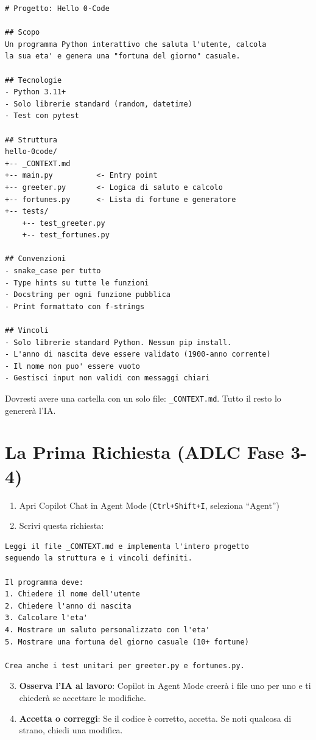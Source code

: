\begin{lstlisting}[language={},title={\texttt{\_CONTEXT.md} per Hello 0-Code}]
# Progetto: Hello 0-Code

## Scopo
Un programma Python interattivo che saluta l'utente, calcola
la sua eta' e genera una "fortuna del giorno" casuale.

## Tecnologie
- Python 3.11+
- Solo librerie standard (random, datetime)
- Test con pytest

## Struttura
hello-0code/
+-- _CONTEXT.md
+-- main.py          <- Entry point
+-- greeter.py       <- Logica di saluto e calcolo
+-- fortunes.py      <- Lista di fortune e generatore
+-- tests/
    +-- test_greeter.py
    +-- test_fortunes.py

## Convenzioni
- snake_case per tutto
- Type hints su tutte le funzioni
- Docstring per ogni funzione pubblica
- Print formattato con f-strings

## Vincoli
- Solo librerie standard Python. Nessun pip install.
- L'anno di nascita deve essere validato (1900-anno corrente)
- Il nome non puo' essere vuoto
- Gestisci input non validi con messaggi chiari
\end{lstlisting}

\begin{checkpointbox}
Dovresti avere una cartella con un solo file: \texttt{\_CONTEXT.md}. Tutto il resto lo genererà l'IA.
\end{checkpointbox}

\section{La Prima Richiesta (ADLC Fase 3-4)}

\begin{praticabox}[title={Pratica --- Generare il codice}]
\begin{enumerate}
  \item Apri Copilot Chat in Agent Mode (\texttt{Ctrl+Shift+I}, seleziona ``Agent'')
  \item Scrivi questa richiesta:
\end{enumerate}
\begin{lstlisting}[language={}]
Leggi il file _CONTEXT.md e implementa l'intero progetto
seguendo la struttura e i vincoli definiti.

Il programma deve:
1. Chiedere il nome dell'utente
2. Chiedere l'anno di nascita
3. Calcolare l'eta'
4. Mostrare un saluto personalizzato con l'eta'
5. Mostrare una fortuna del giorno casuale (10+ fortune)

Crea anche i test unitari per greeter.py e fortunes.py.
\end{lstlisting}
\begin{enumerate}
  \setcounter{enumi}{2}
  \item \textbf{Osserva l'IA al lavoro}: Copilot in Agent Mode creerà i file uno per uno e ti chiederà se accettare le modifiche.
  \item \textbf{Accetta o correggi}: Se il codice è corretto, accetta. Se noti qualcosa di strano, chiedi una modifica.
\end{enumerate}
\end{praticabox}

